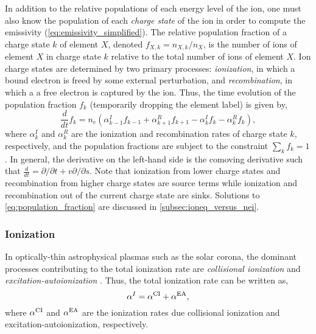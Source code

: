 In addition to the relative populations of each energy level of the ion, one must also know the population of each \textit{charge state} of the ion in order to compute the emissivity (\autoref{eq:emissivity_simplified}). The relative population fraction of a charge state $k$ of element $X$, denoted $f_{X,k}=n_{X,k}/n_X$, is the number of ions of element $X$ in charge state $k$ relative to the total number of ions of element $X$. Ion charge states are determined by two primary processes: \textit{ionization}, in which a bound electron is freed by some external perturbation, and \textit{recombination}, in which a a free electron is captured by the ion. Thus, the time evolution of the population fraction $f_k$ (temporarily dropping the element label) is given by,
\begin{equation}\label{eq:population_fraction}
    \frac{d}{dt}f_k = n_e(\alpha_{k-1}^I f_{k-1} + \alpha_{k+1}^R f_{k+1} - \alpha_{k}^I f_k - \alpha_k^R f_k),
\end{equation}
where $\alpha_k^I$ and $\alpha_k^R$ are the ionization and recombination rates of charge state $k$, respectively, and the population fractions are subject to the constraint $\sum_kf_k=1$ \citep{del_zanna_solar_2018}. In general, the derivative on the left-hand side is the comoving derivative such that $\frac{d}{dt}=\partial/\partial t + v\partial/\partial s$. Note that ionization from lower charge states and recombination from higher charge states are source terms while ionization and recombination out of the current charge state are sinks. Solutions to \autoref{eq:population_fraction} are discussed in \autoref{subsec:ioneq_versus_nei}.

\subsubsection{Ionization}

In optically-thin astrophysical plasmas such as the solar corona, the dominant processes contributing to the total ionization rate are \textit{collisional ionization} and \textit{excitation-autoionization} \citep{bradshaw_collisional_2013}. Thus, the total ionization rate can be written as,
\begin{equation}\label{eq:total_ionization_rate}
    \alpha^I = \alpha^\textup{CI} + \alpha^\textup{EA},
\end{equation}
where $\alpha^\textup{CI}$ and $\alpha^\textup{EA}$ are the ionization rates due collisional ionization and excitation-autoionization, respectively. 

